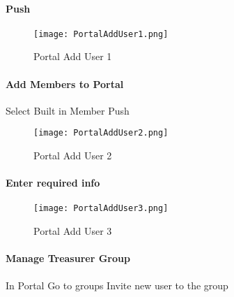 \vspace{.2in}

\paragraph*{\Large Push }

 \begin{figure}[h!]
 \centering
     \texttt{[image: PortalAddUser1.png]}
 \caption{Portal Add User 1}
 \end{figure}
 \clearpage
 \paragraph[Add Members to Portal]{\Large Add Members to Portal\texorpdfstring{\\}{}}
 \vspace{.4in}

 {\Large Select Built in Member \rtArrow Push }
 \vspace{.4in}

 \begin{figure}[h!]
 \centering
     \texttt{[image: PortalAddUser2.png]}
 \caption{Portal Add User 2}
 \end{figure}
 \clearpage
 \paragraph[Enter required info]{\Large Enter required info\texorpdfstring{\\}{}}
 \vspace{.5in}

 \begin{figure}[h!]
 \centering
     \texttt{[image: PortalAddUser3.png]}
 \caption{Portal Add User 3}
 \end{figure}
 \clearpage
 \paragraph[Manage Treasurer Group]{\Large Manage Treasurer Group\texorpdfstring{\\}{}}
 \vspace{.5in}

 In Portal \rtArrow Go to groups \rtArrow Invite new user to the group
 \vspace{.5in}

